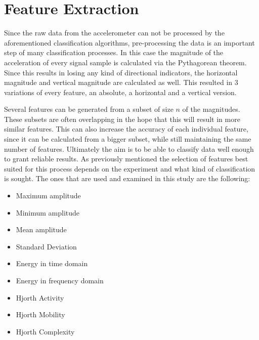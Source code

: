 \section{Feature Extraction}
\label{section:features}

Since the raw data from the accelerometer can not be processed by the aforementioned classification algorithms, pre-processing the data is an important step of many classification processes. In this case the magnitude of the acceleration of every signal sample is calculated via the Pythagorean theorem. Since this results in losing any kind of directional indicators, the horizontal magnitude and vertical magnitude are calculated as well. This resulted in 3 variations of every feature, an absolute, a horizontal and a vertical version.

Several features can be generated from a subset of size $n$ of the magnitudes. These subsets are often overlapping in the hope that this will result in more similar features. This can also increase the accuracy of each individual feature, since it can be calculated from a bigger subset, while still maintaining the same number of features. Ultimately the aim is to be able to classify data well enough to grant reliable results. As previously mentioned the selection of features best suited for this process depends on the experiment and what kind of classification is sought. The ones that are used and examined in this study are the following:

\begin{itemize}
    \item Maximum amplitude
        
    \item Minimum amplitude

    \item Mean amplitude
        
    \item Standard Deviation
        
    \item Energy in time domain
    
    \item Energy in frequency domain
    
    \item Hjorth Activity

    \item Hjorth Mobility

    \item Hjorth Complexity
\end{itemize}

